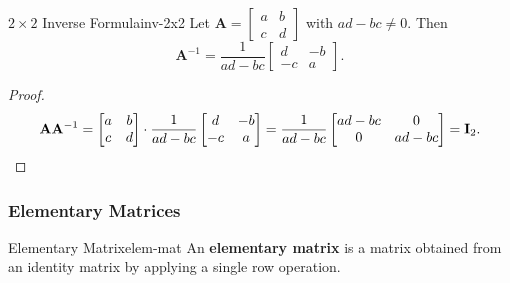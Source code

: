 \begin{theorem}{$2 \times 2$ Inverse Formula}{inv-2x2}
  Let $\mathbf{A} =
    \begin{bmatrix}
      a & b \\ c & d
    \end{bmatrix}
  $ with $ad - bc \neq 0$. Then
  \[
    \mathbf{A}^{-1} = \frac{1}{ad - bc}
    \begin{bmatrix}
      d & -b \\ -c & a
    \end{bmatrix}
    .
  \]
\end{theorem}

\begin{proof}
  \[
    \mathbf{A}\mathbf{A}^{-1}
    =
    \begin{bmatrix}
      a & b \\ c & d
    \end{bmatrix}
    \cdot \frac{1}{ad - bc}
    \begin{bmatrix}
      d & -b \\ -c & a
    \end{bmatrix}
    = \frac{1}{ad - bc}
    \begin{bmatrix}
      ad - bc & 0 \\ 0 & ad - bc
    \end{bmatrix}
    = \mathbf{I}_2. \qedhere
  \]
\end{proof}

\subsubsection{Elementary Matrices}

\begin{definition}{Elementary Matrix}{elem-mat}
  An \textbf{elementary matrix} is a matrix obtained from an identity matrix by applying a single row operation.
\end{definition}

